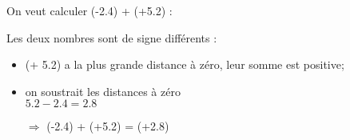 \begin{myexs}
		On veut calculer (-\num{2.4}) + (+\num{5.2}) :
		
		Les deux nombres sont de signe différents :
		\begin{itemize}
			\item (+ \num{5.2}) a la plus grande distance à zéro, leur somme est positive;
			\item on soustrait les distances à zéro \\ $\num{5.2} - \num{2.4} = \num{2.8}$
			\item[$\Rightarrow$] (-\num{2.4}) + (+\num{5.2}) = (+\num{2.8})
		\end{itemize} 
		
		\vspace*{1cm}
		
		
		\iftoggle{eleve}{%
			\newpage
			On veut calculer (-\num{4.6}) + (+\num{3.7}) :
			
			\hrulefill
			\begin{itemize}
				\item \hrulefill
				
				\vspace*{0.2cm}
				
				\hrulefill
				\item \hrulefill \\ \hrulefill
				\item[$\Rightarrow$] \hrulefill
			\end{itemize} 
		}{%
			On veut calculer (-\num{4.6}) + (+\num{3.7}) :
			
			Les deux nombres sont de signe différents :
			\begin{itemize}
				\item (- \num{4.6}) a la plus grande distance à zéro, leur somme est négative;
				\item on soustrait les distances à zéro \\ $\num{4.6} - \num{3.7} = \num{0.9}$
				\item[$\Rightarrow$] (-\num{4.6}) + (-\num{3.7}) = (-\num{8.3})
			\end{itemize} 
		}
\end{myexs}




